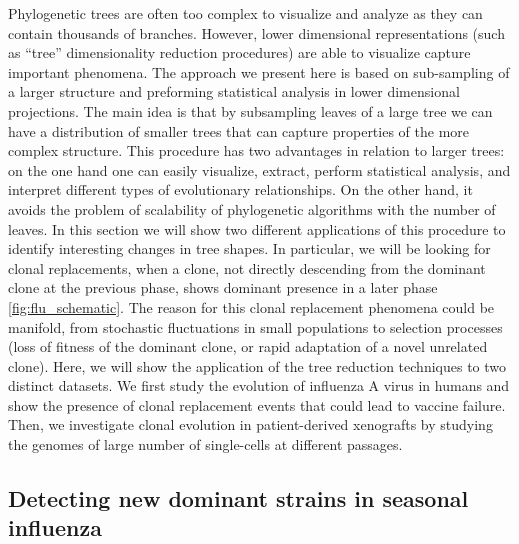 \documentclass[a4paper,11pt]{article}
\begin{document}
Phylogenetic trees are often too complex to visualize and analyze as they can contain thousands of branches. However, lower dimensional representations (such as ``tree'' dimensionality reduction procedures) are able to visualize capture important phenomena. The approach we present here is based on sub-sampling of a larger structure and preforming statistical analysis in lower dimensional projections. The main idea is that by subsampling leaves of a large tree we can have a distribution of smaller trees that can capture properties of the more complex structure.
This procedure has two advantages in relation to larger trees: on the one hand one can easily visualize, extract, perform statistical analysis, and interpret different types of evolutionary relationships.
On the other hand, it avoids the problem of scalability of phylogenetic algorithms with the number of leaves. In this section we will show two different applications of this procedure to identify interesting changes in tree shapes. In particular, we will be looking for clonal replacements, when a clone, not directly descending from the dominant clone at the previous phase, shows dominant presence in a later phase \ref{fig:flu_schematic}.
The reason for this clonal replacement phenomena could be manifold, from stochastic fluctuations in small populations to selection processes (loss of fitness of the dominant clone, or rapid adaptation of a novel unrelated clone).
Here, we will show the application of the tree reduction techniques to two distinct datasets.
We first study the evolution of influenza A virus in humans and show the presence of clonal replacement events that could lead to vaccine failure.
Then, we investigate clonal evolution in patient-derived xenografts by studying the genomes of large number of single-cells at different passages. 

\subsection{Detecting new dominant strains in seasonal influenza}
\end{document}
